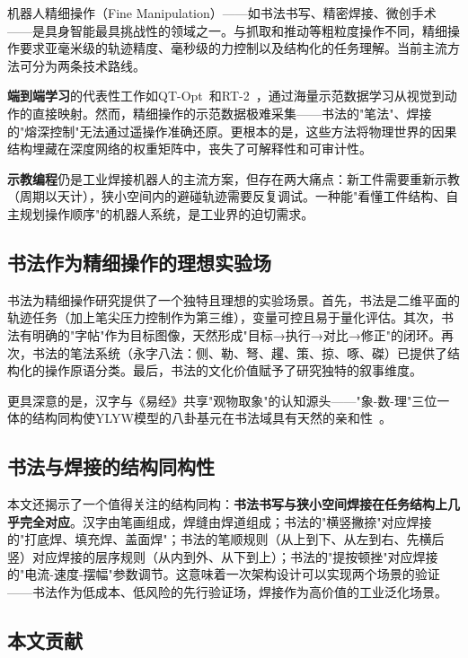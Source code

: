 机器人精细操作（Fine Manipulation）——如书法书写、精密焊接、微创手术——是具身智能最具挑战性的领域之一。与抓取和推动等粗粒度操作不同，精细操作要求亚毫米级的轨迹精度、毫秒级的力控制以及结构化的任务理解。当前主流方法可分为两条技术路线。

\textbf{端到端学习}的代表性工作如QT-Opt~\cite{kalashnikov2018qt}和RT-2~\cite{brohan2023rt2}，通过海量示范数据学习从视觉到动作的直接映射。然而，精细操作的示范数据极难采集——书法的"笔法"、焊接的"熔深控制"无法通过遥操作准确还原。更根本的是，这些方法将物理世界的因果结构埋藏在深度网络的权重矩阵中，丧失了可解释性和可审计性。

\textbf{示教编程}仍是工业焊接机器人的主流方案，但存在两大痛点：新工件需要重新示教（周期以天计），狭小空间内的避碰轨迹需要反复调试。一种能"看懂工件结构、自主规划操作顺序"的机器人系统，是工业界的迫切需求。

\subsection{书法作为精细操作的理想实验场}

书法为精细操作研究提供了一个独特且理想的实验场景。首先，书法是二维平面的轨迹任务（加上笔尖压力控制作为第三维），变量可控且易于量化评估。其次，书法有明确的"字帖"作为目标图像，天然形成"目标→执行→对比→修正"的闭环。再次，书法的笔法系统（永字八法：侧、勒、弩、趯、策、掠、啄、磔）已提供了结构化的操作原语分类。最后，书法的文化价值赋予了研究独特的叙事维度。

更具深意的是，汉字与《易经》共享"观物取象"的认知源头——"象-数-理"三位一体的结构同构使YLYW模型的八卦基元在书法域具有天然的亲和性~\cite{ma2024shufa}。

\subsection{书法与焊接的结构同构性}

本文还揭示了一个值得关注的结构同构：\textbf{书法书写与狭小空间焊接在任务结构上几乎完全对应}。汉字由笔画组成，焊缝由焊道组成；书法的"横竖撇捺"对应焊接的"打底焊、填充焊、盖面焊"；书法的笔顺规则（从上到下、从左到右、先横后竖）对应焊接的层序规则（从内到外、从下到上）；书法的"提按顿挫"对应焊接的"电流-速度-摆幅"参数调节。这意味着一次架构设计可以实现两个场景的验证——书法作为低成本、低风险的先行验证场，焊接作为高价值的工业泛化场景。

\subsection{本文贡献}


